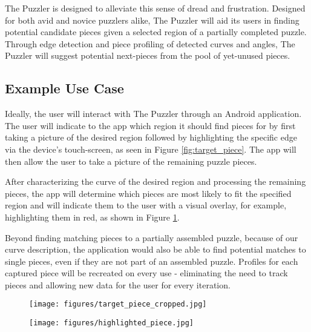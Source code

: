 \documentclass[12pt]{report}
\begin{document}
The Puzzler is designed to alleviate this sense of dread and frustration. Designed for both avid and novice puzzlers alike, The Puzzler will aid its users in finding potential candidate pieces given a selected region of a partially completed puzzle. Through edge detection and piece profiling of detected curves and angles, The Puzzler will suggest potential next-pieces from the pool of yet-unused pieces.


\subsection*{Example Use Case}
Ideally, the user will interact with The Puzzler through an Android application. The user will indicate to the app which region it should find pieces for by first taking a picture of the desired region followed by highlighting the specific edge via the device's touch-screen, as seen in Figure \ref{fig:target_piece}. The app will then allow the user to take a picture of the remaining puzzle pieces. 

After characterizing the curve of the desired region and processing the remaining pieces, the app will determine which pieces are most likely to fit the specified region and will indicate them to the user with a visual overlay, for example, highlighting them in red, as shown in Figure \ref{fig:highlighted_piece}.

Beyond finding matching pieces to a partially assembled puzzle, because of our curve description, the application would also be able to find potential matches to single pieces, even if they are not part of an assembled puzzle. Profiles for each captured piece will be recreated on every use - eliminating the need to track pieces and allowing new data for the user for every iteration.

\begin{figure}
\centering
\begin{minipage}{.47\textwidth}
  \centering
  \texttt{[image: figures/target\_piece\_cropped.jpg]}
  \label{fig:target_piece}
\end{minipage}%
\hfill{}%
\begin{minipage}{.47\textwidth}
  \centering
  \texttt{[image: figures/highlighted\_piece.jpg]}
  \label{fig:highlighted_piece}
\end{minipage}
\end{figure}
\end{document}
